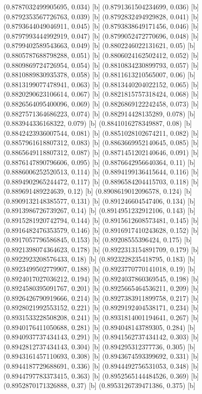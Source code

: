{{{(0.8787032499905695, 0.034) [b] 
(0.8791361504234699, 0.036) [b] 
(0.8792353567726763, 0.039) [b] 
(0.8792832494929828, 0.041) [b] 
(0.8793644049046911, 0.045) [b] 
(0.8793838649171456, 0.046) [b] 
(0.8797993444992919, 0.047) [b] 
(0.8799052472770696, 0.048) [b] 
(0.8799402589543663, 0.049) [b] 
(0.8802246022131621, 0.05) [b] 
(0.8805787688798288, 0.051) [b] 
(0.8806024162502412, 0.052) [b] 
(0.8809869724726954, 0.054) [b] 
(0.8810834230899793, 0.057) [b] 
(0.8810889830935378, 0.058) [b] 
(0.8811613210565007, 0.06) [b] 
(0.8813199077478941, 0.063) [b] 
(0.8813440204022152, 0.065) [b] 
(0.8820290623106614, 0.067) [b] 
(0.8821815757318424, 0.068) [b] 
(0.8826564095400096, 0.069) [b] 
(0.8826869122242458, 0.073) [b] 
(0.8827571364686223, 0.074) [b] 
(0.882914428135289, 0.078) [b] 
(0.883944336168322, 0.079) [b] 
(0.8841016278349887, 0.08) [b] 
(0.8842423936007544, 0.081) [b] 
(0.8851028102674211, 0.082) [b] 
(0.8857961618807312, 0.083) [b] 
(0.8863669952140645, 0.085) [b] 
(0.8865649118807312, 0.087) [b] 
(0.8871451202140646, 0.091) [b] 
(0.8876147890796606, 0.095) [b] 
(0.8876642956640364, 0.11) [b] 
(0.8886006252520513, 0.114) [b] 
(0.8894199136415644, 0.116) [b] 
(0.8894902965244472, 0.117) [b] 
(0.8896584204415703, 0.118) [b] 
(0.889691489224639, 0.12) [b] 
(0.8908619012096578, 0.124) [b] 
(0.8909132148385577, 0.131) [b] 
(0.891246604547406, 0.134) [b] 
(0.8913986726739267, 0.14) [b] 
(0.8914951232912106, 0.143) [b] 
(0.8915281920742794, 0.144) [b] 
(0.8915612608573481, 0.145) [b] 
(0.8916482476353579, 0.146) [b] 
(0.8916917410243628, 0.152) [b] 
(0.8917057796586845, 0.153) [b] 
(0.89208555396424, 0.175) [b] 
(0.8921398074364623, 0.178) [b] 
(0.8922313154891709, 0.179) [b] 
(0.8922923208576433, 0.18) [b] 
(0.8923228235418795, 0.183) [b] 
(0.8923499502779907, 0.188) [b] 
(0.8923770770141018, 0.19) [b] 
(0.8924017027036212, 0.194) [b] 
(0.8924037860369545, 0.198) [b] 
(0.8924580395091767, 0.201) [b] 
(0.8925665464536211, 0.209) [b] 
(0.8926426790919666, 0.214) [b] 
(0.8927383911899758, 0.217) [b] 
(0.8928021992553152, 0.221) [b] 
(0.8929192404538171, 0.234) [b] 
(0.8931533228508208, 0.241) [b] 
(0.8931814001194641, 0.267) [b] 
(0.8940176411050688, 0.281) [b] 
(0.894048143789305, 0.284) [b] 
(0.8940937737434143, 0.291) [b] 
(0.8941562737434142, 0.303) [b] 
(0.8942812737434143, 0.304) [b] 
(0.894295312377736, 0.305) [b] 
(0.8943161457110693, 0.308) [b] 
(0.8943674593399692, 0.331) [b] 
(0.8944187729688691, 0.336) [b] 
(0.8944492756531053, 0.348) [b] 
(0.8944797783373415, 0.363) [b] 
(0.8952565144484526, 0.369) [b] 
(0.8952870171326888, 0.37) [b] 
(0.8953126739471386, 0.375) [b] 
}}}
